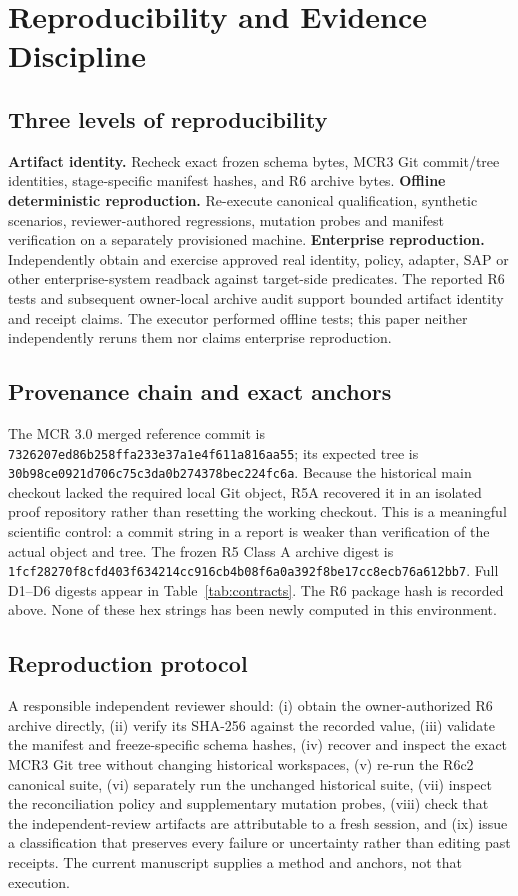 \documentclass[11pt,twocolumn]{article}
\begin{document}
\section{Reproducibility and Evidence Discipline}
\subsection{Three levels of reproducibility}
\textbf{Artifact identity.} Recheck exact frozen schema bytes, MCR3 Git commit/tree identities, stage-specific manifest hashes, and R6 archive bytes. \textbf{Offline deterministic reproduction.} Re-execute canonical qualification, synthetic scenarios, reviewer-authored regressions, mutation probes and manifest verification on a separately provisioned machine. \textbf{Enterprise reproduction.} Independently obtain and exercise approved real identity, policy, adapter, SAP or other enterprise-system readback against target-side predicates. The reported R6 tests and subsequent owner-local archive audit support bounded artifact identity and receipt claims. The executor performed offline tests; this paper neither independently reruns them nor claims enterprise reproduction.

\subsection{Provenance chain and exact anchors}
The MCR 3.0 merged reference commit is \texttt{7326207ed86b\allowbreak 258ffa233e37\allowbreak a1e4f611a816\allowbreak aa55}; its expected tree is \texttt{30b98ce0921d\allowbreak 706c75c3da0b\allowbreak 274378bec224\allowbreak fc6a}. Because the historical main checkout lacked the required local Git object, R5A recovered it in an isolated proof repository rather than resetting the working checkout. This is a meaningful scientific control: a commit string in a report is weaker than verification of the actual object and tree. The frozen R5 Class A archive digest is \texttt{1fcf28270f8c\allowbreak fd403f634214\allowbreak cc916cb4b08f\allowbreak 6a0a392f8be1\allowbreak 7cc8ecb76a61\allowbreak 2bb7}. Full D1--D6 digests appear in Table~\ref{tab:contracts}. The R6 package hash is recorded above. None of these hex strings has been newly computed in this environment.

\subsection{Reproduction protocol}
A responsible independent reviewer should: (i) obtain the owner-authorized R6 archive directly, (ii) verify its SHA-256 against the recorded value, (iii) validate the manifest and freeze-specific schema hashes, (iv) recover and inspect the exact MCR3 Git tree without changing historical workspaces, (v) re-run the R6c2 canonical suite, (vi) separately run the unchanged historical suite, (vii) inspect the reconciliation policy and supplementary mutation probes, (viii) check that the independent-review artifacts are attributable to a fresh session, and (ix) issue a classification that preserves every failure or uncertainty rather than editing past receipts. The current manuscript supplies a method and anchors, not that execution.
\end{document}
